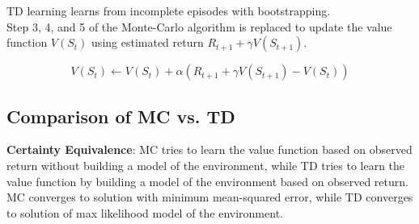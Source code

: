 TD learning learns from incomplete episodes with bootstrapping. \\

\noindent Step 3, 4, and 5 of the Monte-Carlo algorithm is replaced to update the value
function $V(S_t)$ using estimated return $R_{t+1} + \gamma V(S_{t+1})$.

\[
    V(S_t) \leftarrow V(S_t) + \alpha (R_{t+1} + \gamma V(S_{t+1}) - V(S_t))
\]

\subsection{Comparison of MC vs. TD}

\noindent \textbf{Certainty Equivalence}: MC tries to learn the value function based on observed
return without building a model of the environment, while TD tries to learn the
value function by building a model of the environment based on observed return.
MC converges to solution with minimum mean-squared error, while TD converges to
solution of max likelihood model of the environment. \\

